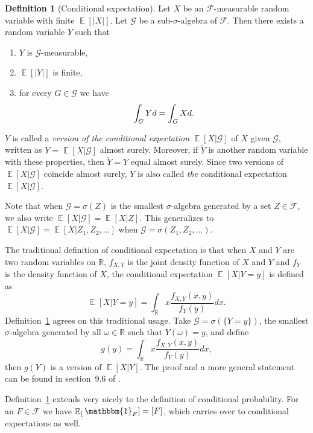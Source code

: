 \documentclass[twoside,a4paper]{report}
\theoremstyle{plain}
\theoremstyle{definition}
\newtheorem{definition}[theorem]{Definition}
\theoremstyle{remark}
\numberwithin{equation}{chapter}
\newcommand{\R}{\mathbb{R}}
\let\P\relax
\DeclareMathOperator{\P}{\mathbb{P}}
\DeclareMathOperator{\E}{\mathbb{E}}
\DeclareMathOperator{\1}{\mathbbm{1}}
\newcommand{\F}{\mathcal{F}}
\renewcommand{\G}{\mathcal{G}}
\begin{document}
\begin{definition}[Conditional expectation]\label{def:conexp}
Let $X$ be an $\F$-measurable random variable with finite $\E[|X|]$. Let $\G$ be a sub-$\sigma$-algebra of $\F$. Then there exists a random variable $Y$ such that 
\begin{enumerate}
\item $Y$ is $\G$-measurable,
\item $\E[|Y|]$ is finite,
\item for every $G\in\G$ we have 
\begin{equation}
\int_G Yd\P=\int_G Xd\P.
\end{equation}
\end{enumerate}
$Y$ is called a \emph{version of the conditional expectation} $\E[X|\G]$ of $X$ given $\G$, written as $Y=\E[X|\G]$ almost surely. Moreover, if $\tilde{Y}$ is another random variable with these properties, then $\tilde{Y}=Y$ equal almost surely. Since two versions of $\E[X|\G]$ coincide almost surely, $Y$ is also called \emph{the} conditional expectation $\E[X|\G]$.
\end{definition}

Note that when $\G=\sigma(Z)$ is the smallest $\sigma$-algebra generated by a set $Z\in\F$, we also write $\E[X|\G]=\E[X|Z]$. This generalizes to $\E[X|\G]=\E[X|Z_1,Z_2,\ldots]$ when $\G=\sigma(Z_1,Z_2,\ldots)$.

The traditional definition of conditional expectation is that when $X$ and $Y$ are two random variables on $\R$, $f_{X,Y}$ is the joint density function of $X$ and $Y$ and $f_Y$ is the density function of $X$, the conditional expectation $\E[X|Y=y]$ is defined as
\begin{equation}
\E[X|Y=y]=\int_\R x\frac{f_{X,Y}(x,y)}{f_Y(y)}dx.
\end{equation}
Definition~\ref{def:conexp} agrees on this traditional usage. Take $\G=\sigma(\{Y=y\})$, the smallest $\sigma$-algebra generated by all $\omega\in\R$ such that $Y(\omega)=y$, and define
\begin{equation}
g(y)=\int_\R x\frac{f_{X,Y}(x,y)}{f_Y(y)}dx,
\end{equation}
then $g(Y)$ is a version of $\E[X|Y]$. The proof and a more general statement can be found in section~9.6 of \cite{Williams91}.

Definition~\ref{def:conexp} extends very nicely to the definition of conditional probability. For an $F\in\F$ we have $\E_[\1_F]=\P[F]$, which carries over to conditional expectations as well.
\end{document}
